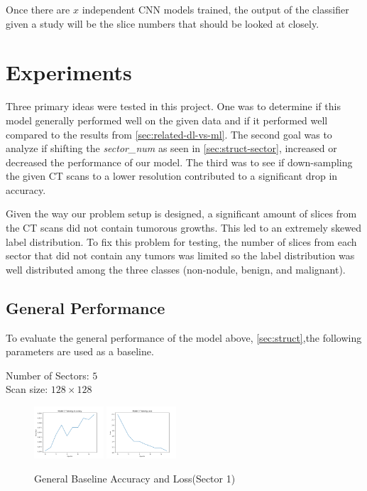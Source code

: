 \documentclass[10pt,twocolumn,letterpaper]{article}
\begin{document}
        Once there are $x$ independent CNN models trained, the output of the classifier given a study will
        be the slice numbers that should be looked at closely.

\section{Experiments} \label{sec:experiments}
   Three primary ideas were tested in this project. One was to determine if this model generally performed well on the given data and if it performed well
   compared to the results from \ref{sec:related-dl-vs-ml}. The second goal was to analyze if shifting the
   {\it sector\_num} as seen in \ref{sec:struct-sector}, increased or decreased the performance of our model. The third was to see if down-sampling the 
   given CT scans to a lower resolution contributed to a significant drop in accuracy.

   Given the way our problem setup is designed, a significant amount of slices from the CT scans did not contain tumorous growths. This led to an extremely
   skewed label distribution. To fix this problem for testing, the number of slices from each sector that did not contain any tumors was limited so the label
   distribution was well distributed among the three classes (non-nodule, benign, and malignant).

   \subsection{General Performance} \label{sec:experiments-general-performance}
      To evaluate the general performance of the model above, \ref{sec:struct},the following parameters are used as a baseline.

      \begin{center}
         Number of Sectors: $5$ \\
         Scan size: $128 \times 128$
      \end{center}

      \begin{figure}[h]
         \centering
         \includegraphics[width=0.23\textwidth]{./images/training_accuracy_5_sector_128_px.png}
         \includegraphics[width=0.23\textwidth]{./images/training_loss_5_sector_128_px.png}
         \caption{General Baseline Accuracy and Loss(Sector 1)}
         \label{fig:experiments-general-acc-loss}
      \end{figure}
\end{document}
